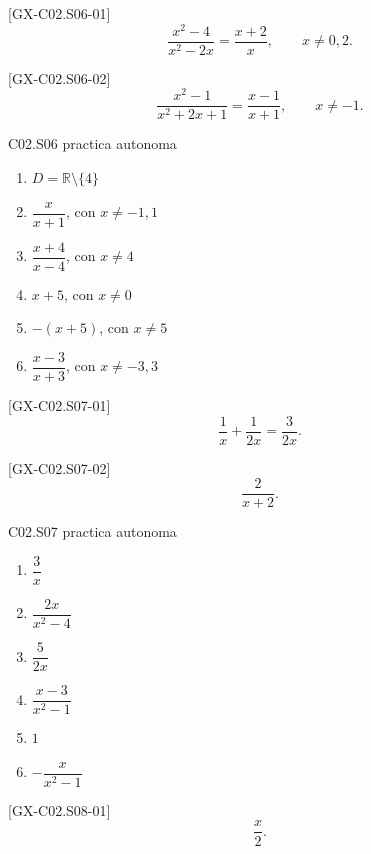\begin{shortanswer}{[GX-C02.S06-01]}
\[
\frac{x^2-4}{x^2-2x}=\frac{x+2}{x},\qquad x\neq 0,2.
\]
\end{shortanswer}

\begin{shortanswer}{[GX-C02.S06-02]}
\[
\frac{x^2-1}{x^2+2x+1}=\frac{x-1}{x+1},\qquad x\neq -1.
\]
\end{shortanswer}

\begin{shortanswer}{C02.S06 practica autonoma}
\begin{enumerate}[label=\textbf{PX-C02.S06-\arabic*:}, leftmargin=*]
  \item \(D=\mathbb{R}\setminus\{4\}\)
  \item \(\dfrac{x}{x+1}\), con \(x\neq -1,1\)
  \item \(\dfrac{x+4}{x-4}\), con \(x\neq 4\)
  \item \(x+5\), con \(x\neq 0\)
  \item \(-(x+5)\), con \(x\neq 5\)
  \item \(\dfrac{x-3}{x+3}\), con \(x\neq -3,3\)
\end{enumerate}
\end{shortanswer}

\begin{shortanswer}{[GX-C02.S07-01]}
\[
\frac{1}{x}+\frac{1}{2x}=\frac{3}{2x}.
\]
\end{shortanswer}

\begin{shortanswer}{[GX-C02.S07-02]}
\[
\frac{2}{x+2}.
\]
\end{shortanswer}

\begin{shortanswer}{C02.S07 practica autonoma}
\begin{enumerate}[label=\textbf{PX-C02.S07-\arabic*:}, leftmargin=*]
  \item \(\dfrac{3}{x}\)
  \item \(\dfrac{2x}{x^2-4}\)
  \item \(\dfrac{5}{2x}\)
  \item \(\dfrac{x-3}{x^2-1}\)
  \item \(1\)
  \item \(-\dfrac{x}{x^2-1}\)
\end{enumerate}
\end{shortanswer}

\begin{shortanswer}{[GX-C02.S08-01]}
\[
\frac{x}{2}.
\]
\end{shortanswer}

